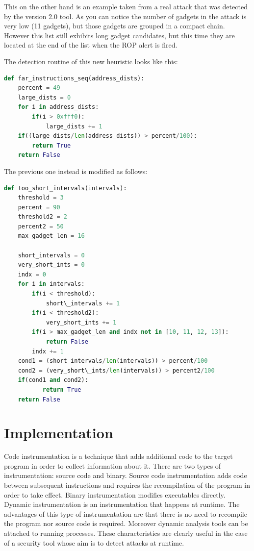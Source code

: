 \documentclass[Lau,binding=0.6cm]{sapthesis}
\begin{document}
This on the other hand is an example taken from a real attack that was detected by the version 2.0 tool. As you can notice the number of gadgets in the attack is very low (11 gadgets), but those gadgets are grouped in a compact chain. However this list still exhibits long gadget candidates, but this time they are located at the end of the list when the ROP alert is fired.

The detection routine of this new heuristic looks like this:

\begin{lstlisting}[language=Python]
def far_instructions_seq(address_dists):
    percent = 49
    large_dists = 0
    for i in address_dists:
        if(i > 0xfff0):
            large_dists += 1
    if((large_dists/len(address_dists)) > percent/100):
        return True
    return False
\end{lstlisting}

The previous one instead is modified as follows:

\begin{lstlisting}[language=Python]
def too_short_intervals(intervals):
    threshold = 3        
    percent = 90
    threshold2 = 2
    percent2 = 50
    max_gadget_len = 16

    short_intervals = 0
    very_short_ints = 0
    indx = 0
    for i in intervals:
        if(i < threshold):
            short\_intervals += 1
        if(i < threshold2):
            very_short_ints += 1
        if(i > max_gadget_len and indx not in [10, 11, 12, 13]):
            return False
        indx += 1
    cond1 = (short_intervals/len(intervals)) > percent/100
    cond2 = (very_short\_ints/len(intervals)) > percent2/100
    if(cond1 and cond2):
           return True
    return False
\end{lstlisting}

\chapter{Implementation}

Code instrumentation is a technique that adds additional code to the target program in order to collect information about it. There are two types of instrumentation: source code and binary.
Source code instrumentation adds code between subsequent instructions and requires the recompilation of the program in order to take effect. Binary instrumentation modifies executables directly.
Dynamic instrumentation is an instrumentation that happens at runtime. The advantages of this type of instrumentation are that there is no need to recompile the program nor source code is required. Moreover dynamic analysis tools can be attached to running processes. These characteristics are clearly useful in the case of a security tool whose aim is to detect attacks at runtime.
\end{document}
